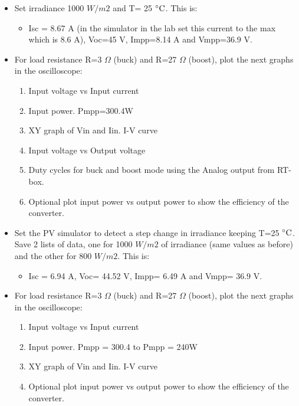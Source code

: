 \begin{itemize}	
	\item Set irradiance 1000 $W /m2$ and T= 25 $\decC$. This is: 
		\begin{itemize}
		\item Isc = 8.67 A (in the simulator in the lab set this current to the max which is 8.6 A), Voc=45 V, Impp=8.14 A and Vmpp=36.9 V.
		\end{itemize} 
	\item For load resistance R=3 $\Omega$ (buck) and R=27 $\Omega$ (boost), plot the next graphs in the oscilloscope:
		\begin{enumerate}
		\item Input voltage vs Input current 
		\item Input power. Pmpp=300.4W
		\item XY graph of Vin and Iin. I-V curve
		\item Input voltage vs Output voltage
		\item Duty cycles for buck and boost mode using the Analog output from RT-box. 
		\item Optional plot input power vs output power to show the efficiency of the converter.
		\end{enumerate}
	
	\item Set the PV simulator to detect a step change in irradiance keeping T=25 $\decC$. Save 2 lists of data, one for 1000 $W /m2$ of irradiance (same values as before) and the other for 800 $W /m2$. This is:
		\begin{itemize}
		\item Isc = 6.94 A, Voc= 44.52 V, Impp= 6.49 A and Vmpp= 36.9 V.
      	\end{itemize} 
      \item For load resistance R=3 $\Omega$ (buck) and R=27 $\Omega$ (boost), plot the next graphs in the oscilloscope:
      \begin{enumerate}
      	\item Input voltage vs Input current 
      	\item Input power. Pmpp = 300.4 to Pmpp = 240W
      	\item XY graph of Vin and Iin. I-V curve
      	\item Optional plot input power vs output power to show the efficiency of the converter.
      \end{enumerate}
  

\end{itemize}
